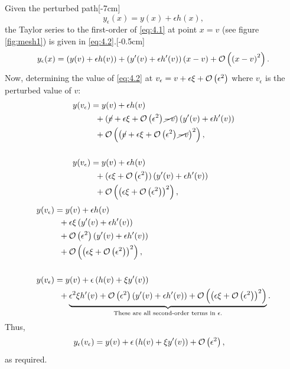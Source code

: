 Given the perturbed path[-7cm]%
\begin{equation}
	\label{eq:4.1}
	y_\epsilon(x) = y(x) + \epsilon h(x),
\end{equation}
the Taylor series to the first-order of \eqref{eq:4.1} at point $x=v$ (see figure \ref{fig:mesh1}) is given in \eqref{eq:4.2}.[-0.5cm]
\begin{equation}
\begin{split}
\label{eq:4.2}
y_\epsilon(x)=\left(y(v) + \epsilon h(v)\right) + \left(y^\prime(v) + \epsilon h^\prime(v)\right)(x - v) + \mathcal{O}\left(\left(x -v\right)^2\right).
\end{split}
\end{equation}
Now, determining the value of \eqref{eq:4.2} at $v_\epsilon = v + \epsilon \xi + \mathcal{O}\left(\epsilon^2\right)$ where $v_\epsilon$ is the perturbed value of $v$:
\begin{equation*}
\begin{split}
y(v_\epsilon)&= y(v) + \epsilon h(v)\\ 
&\;\;+ (\cancel{v} + \epsilon \xi + \mathcal{O}\left(\epsilon^2\right)\cancel{-v})\left(y^\prime(v) +\epsilon h^\prime(v)\right)\\ 
&\;\;+ \mathcal{O}\left(\left(\cancel{v} + \epsilon \xi + \mathcal{O}\left(\epsilon^2\right)\cancel{-v}\right)^2\right),\\\\
y(v_\epsilon)&= y(v) + \epsilon h(v)\\
&\;\;+ (\epsilon \xi + \mathcal{O}\left(\epsilon^2\right))\left(y^\prime(v) +\epsilon h^\prime(v)\right)\\
&\;\;+ \mathcal{O}\left(\left(\epsilon \xi + \mathcal{O}\left(\epsilon^2\right)\right)^2\right),
\end{split}
\end{equation*}
\begin{equation*}
\begin{split}
y(v_\epsilon)&= y(v) + \epsilon h(v)\\
&\;\;+ \epsilon\xi\left(y^\prime(v) +\epsilon h^\prime(v)\right)\\
&\;\;+ \mathcal{O}\left(\epsilon^2\right)\left(y^\prime(v) +\epsilon h^\prime(v)\right)\\
&\;\;+ \mathcal{O}\left(\left(\epsilon \xi + \mathcal{O}\left(\epsilon^2\right)\right)^2\right),\\\\
y(v_\epsilon)&=y(v) + \epsilon \left(h(v) + \xi y^\prime(v)\right)\\
&\;\;+ \underbrace{\epsilon^2\xi h^\prime(v)
+ \mathcal{O} \left(\epsilon^2\right)\left(y^\prime(v) +\epsilon h^\prime(v)\right)+ \mathcal{O}\left(\left(\epsilon \xi + \mathcal{O}\left(\epsilon^2\right)\right)^2\right)}_\text{These are all second-order terms in $\epsilon$.}.
\end{split}
\end{equation*}
Thus,
\begin{equation}
\label{eq:4.3}
\begin{split}
y_\epsilon(v_\epsilon)&=y(v) + \epsilon \left(h(v) + \xi y^\prime(v)\right) + \mathcal{O}\left(\epsilon^2\right),
\end{split}
\end{equation}
as required.

